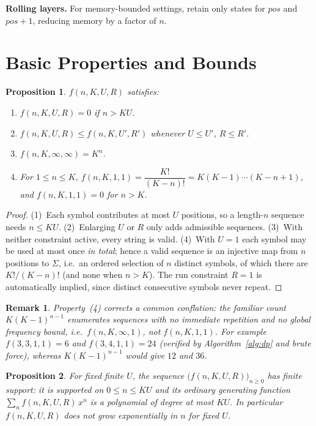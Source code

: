\documentclass[a4paper,12pt]{article}
\newtheorem{proposition}{Proposition}
\newtheorem{remark}{Remark}
\begin{document}
\textbf{Rolling layers.}
For memory-bounded settings, retain only states for $pos$ and $pos+1$,
reducing memory by a factor of $n$.

\section{Basic Properties and Bounds}
\label{sec:bounds}

\begin{proposition}\label{prop:basic}
$f(n,K,U,R)$ satisfies:
\begin{enumerate}
    \item $f(n,K,U,R)=0$ if $n>K U$.
    \item $f(n,K,U,R)\le f(n,K,U',R')$ whenever $U\le U'$, $R\le R'$.
    \item $f(n,K,\infty,\infty)=K^n$.
    \item For $1\le n\le K$,
          $f(n,K,1,1)=\dfrac{K!}{(K-n)!}=K(K-1)\cdots(K-n+1)$, and
          $f(n,K,1,1)=0$ for $n>K$.
\end{enumerate}
\end{proposition}

\begin{proof}
(1)~Each symbol contributes at most $U$ positions, so a length-$n$
sequence needs $n\le KU$.
(2)~Enlarging $U$ or $R$ only adds admissible sequences.
(3)~With neither constraint active, every string is valid.
(4)~With $U=1$ each symbol may be used at most once \emph{in total};
hence a valid sequence is an injective map from $n$ positions to
$\Sigma$, i.e.\ an ordered selection of $n$ distinct symbols, of which
there are $K!/(K-n)!$ (and none when $n>K$).  The run constraint
$R=1$ is automatically implied, since distinct consecutive symbols
never repeat.
\end{proof}

\begin{remark}
Property~(4) corrects a common conflation: the familiar count
$K(K-1)^{n-1}$ enumerates sequences with \emph{no immediate
repetition and no global frequency bound}, i.e.\ $f(n,K,\infty,1)$,
not $f(n,K,1,1)$.  For example $f(3,3,1,1)=6$ and $f(3,4,1,1)=24$
(verified by Algorithm~\ref{alg:dp} and brute force), whereas
$K(K-1)^{n-1}$ would give $12$ and $36$.
\end{remark}

\begin{proposition}\label{prop:finite}
For fixed finite $U$, the sequence $\bigl(f(n,K,U,R)\bigr)_{n\ge 0}$
has finite support: it is supported on $0\le n\le KU$ and its ordinary
generating function $\sum_{n} f(n,K,U,R)\,x^n$ is a polynomial of
degree at most $KU$.  In particular $f(n,K,U,R)$ does \emph{not} grow
exponentially in $n$ for fixed $U$.
\end{proposition}
\end{document}
